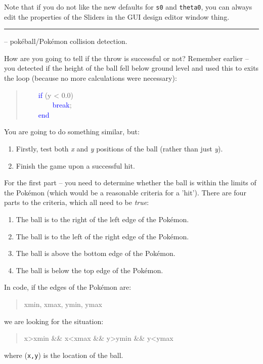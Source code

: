 \documentclass{tufte-book} %
\newenvironment{docspec}{\begin{quotation}\ttfamily\parskip0pt\parindent0pt\ignorespaces}{\end{quotation}}
\begin{document}
Note that if you do not like the new defaults for  \texttt{s0} and \texttt{theta0}, you can always edit the properties of the \textsf{Sliders} in the GUI design editor window thing.

\vspace{1mm}
\noindent\rule{4cm}{0.5pt}
\vspace{-2mm}

 -- pok\'eball/Pok\'emon collision detection.

How are you going to tell if the throw is successful or not? Remember earlier -- you detected if the height of the ball fell below ground level and used this to exits the loop (because no more calculations were necessary):
\begin{docspec}
\ \ \ \    \textcolor{blue}{if} (y < 0.0)\\
\ \ \ \ \ \ \ \        \textcolor{blue}{break};\\
\ \ \ \    \textcolor{blue}{end}
\end{docspec}
You are going to do something similar, but:
\begin{enumerate}[noitemsep]
\setlength{\itemindent}{.2in}
\item Firstly, test both \textit{x} and \textit{y} positions of the ball (rather than just \textit{y}).
\item Finish the game upon a successful hit.
\end{enumerate}

For the first part -- you need to determine whether the ball is within the limits of the Pok\'emon (which would be a reasonable criteria for a 'hit'). There are four parts to the criteria, which all need to be \textit{true}:
\begin{enumerate}[noitemsep]
\setlength{\itemindent}{.2in}
\item The ball is to the right of the left edge of the Pok\'emon.
\item The ball is to the left of the right edge of the Pok\'emon.
\item The ball is above the bottom edge of the Pok\'emon.
\item The ball is below the top edge of the Pok\'emon.
\end{enumerate}
In code, if the edges of the Pok\'emon are:
\begin{docspec}
xmin, xmax, ymin, ymax
\end{docspec}
we are looking for the situation:
\begin{docspec}
x>xmin \&\& x<xmax \&\& y>ymin \&\& y<ymax
\end{docspec}
where (\texttt{x,y}) is the location of the ball.
\end{document}
